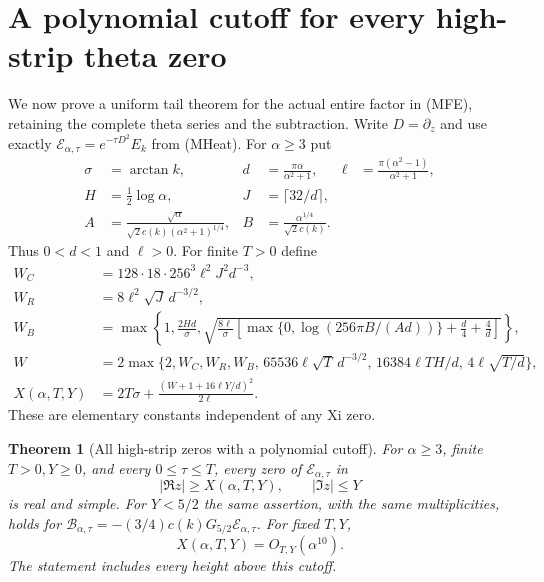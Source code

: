 \documentclass[11pt]{article}
\newtheorem{theorem}{Theorem}
\theoremstyle{remark}\newtheorem{remark}[theorem]{Remark}
\begin{document}
\section{A polynomial cutoff for every high-strip theta zero}
We now prove a uniform tail theorem for the actual entire factor
in (MFE), retaining the complete theta series and the subtraction.
Write $D=\partial_z$ and use exactly
$\mathcal E_{\alpha,\tau}=e^{-\tau D^2}E_k$ from (MHeat).
For $\alpha\ge3$ put
\[
 \begin{aligned}
 \sigma&=\arctan k,& d&=\frac{\pi\alpha}{\alpha^2+1},
 &\ell&=\frac{\pi(\alpha^2-1)}{\alpha^2+1},\\
 H&=\tfrac12\log\alpha,&J&=\lceil32/d\rceil,\\
 A&=\frac{\sqrt\alpha}{\sqrt2c(k)(\alpha^2+1)^{1/4}},
 &B&=\frac{\alpha^{1/4}}{\sqrt2c(k)} .
 \end{aligned}                                          \tag{PHT1}
\]
Thus $0<d<1$ and $\ell>0$. For finite $T>0$ define
\[
 \begin{split}
 W_C&=128\cdot18\cdot256^3\ell^2J^2d^{-3},\\
 W_R&=8\ell^2\sqrt J\,d^{-3/2},\\
 W_B&=\max\left\{1,\frac{2Hd}{\sigma},
 \sqrt{\frac{8\ell}{\sigma}
 \left[\max\{0,\log(256\pi B/(Ad))\}+\frac d4+\frac4d\right]}\right\},\\
 W&=2\max\{2,W_C,W_R,W_B,\,
 65536\ell\sqrt T\,d^{-3/2},\,16384\ell TH/d,\,4\ell\sqrt{T/d}\},\\
 X(\alpha,T,Y)&=2T\sigma+
                    \frac{(W+1+16\ell Y/d)^2}{2\ell}.
 \end{split}                                                   \tag{PHT2}
\]
These are elementary constants independent of any Xi zero.

\begin{theorem}[All high-strip zeros with a polynomial cutoff]
\label{thm:polynomial-theta-tail}
For $\alpha\ge3$, finite $T>0,Y\ge0$, and every $0\le\tau\le T$,
every zero of $\mathcal E_{\alpha,\tau}$ in
\[
       |\Re z|\ge X(\alpha,T,Y),\qquad |\Im z|\le Y
\]
is real and simple. For $Y<5/2$ the same assertion, with the same
multiplicities, holds for
$\mathcal B_{\alpha,\tau}=-(3/4)c(k)G_{5/2}\mathcal E_{\alpha,\tau}$.
For fixed $T,Y$,
\[
                X(\alpha,T,Y)=O_{T,Y}(\alpha^{10}).       \tag{PHT3}
\]
The statement includes every height above this cutoff.
\end{theorem}
\end{document}
